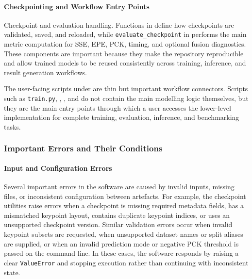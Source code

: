 ﻿\documentclass[11pt,a4paper]{article}
\begin{document}
\paragraph*{Checkpointing and Workflow Entry Points}

Checkpoint and evaluation handling. Functions in
 define how checkpoints are validated,
saved, and reloaded, while \texttt{evaluate\_checkpoint} in
 performs the main metric
computation for SSE, EPE, PCK, timing, and optional fusion diagnostics. These
components are important because they make the repository reproducible and
allow trained models to be reused consistently across training, inference, and
result generation workflows.

\medskip

\noindent
The user-facing scripts under  are thin but important workflow
connectors. Scripts such as \texttt{train.py}, ,
, and  do not contain the
main modelling logic themselves, but they are the main entry points through
which a user accesses the lower-level implementation for complete training,
evaluation, inference, and benchmarking tasks.

\subsubsection{Important Errors and Their Conditions}

\paragraph*{Input and Configuration Errors}

Several important errors in the software are caused by invalid inputs,
missing files, or inconsistent configuration between artefacts. For example,
the checkpoint utilities raise errors when a checkpoint is missing required
metadata fields, has a mismatched keypoint layout, contains duplicate
keypoint indices, or uses an unsupported checkpoint version. Similar
validation errors occur when invalid keypoint subsets are requested, when
unsupported dataset names or split aliases are supplied, or when an invalid
prediction mode or negative PCK threshold is passed on the command line. In
these cases, the software responds by raising a clear \texttt{ValueError} and
stopping execution rather than continuing with inconsistent state.
\end{document}
